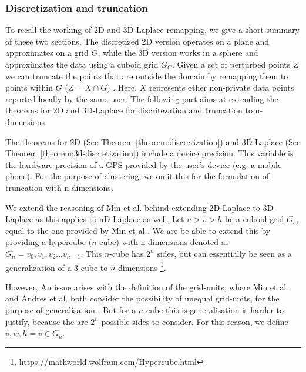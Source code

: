 \subsubsection{Discretization and truncation} \label{theory:nd-laplace-truncation}
To recall the working of 2D and 3D-Laplace remapping, we give a short summary of these two sections. The discretized 2D version operates on a plane and approximates on a grid $G$, while the 3D version works in a sphere and approximates the data using a cuboid grid  $G_C$.
Given a set of perturbed points $Z$ we can truncate the points that are outside the domain by remapping them to points within $G$ ($Z = X \cap G$) \citep{DBLP:journals/corr/abs-1212-1984}.
Here, $X$ represents other non-private data points reported locally by the same user.
The following part aims at extending the theorems for 2D and 3D-Laplace for discritezation and truncation to n-dimensions. \newline

The theorems for 2D (See Theorem \ref{theorem:discretization}) and 3D-Laplace (See Theorem \ref{theorem:3d-discretization}) include a device precision. 
This variable is the hardware precision of a GPS provided by the user's device (e.g. a mobile phone). 
For the purpose of clustering, we omit this for the formulation of truncation with n-dimensions.

We extend the reasoning of Min et al. behind extending 2D-Laplace to 3D-Laplace as this applies to nD-Laplace as well.
Let $u > v > h$ be a cuboid grid $G_c$, equal to the one provided by Min et al \citep{9646489}.
We are be-able to extend this by providing a hypercube ($n$-cube) with n-dimensions denoted as $G_n = v_0, v_1, v_2 ... v_{n-1}$. This $n$-cube has $2^n$ sides, but can essentially be seen as a generalization of a 3-cube to $n$-dimensions \footnote{https://mathworld.wolfram.com/Hypercube.html}.

However, An issue arises with the definition of the grid-units, where Min et al. and Andres et al. both consider the possibility of unequal grid-units, for the purpose of generalisation \citep{9646489, DBLP:journals/corr/abs-1212-1984}. 
But for a $n$-cube this is generalisation is harder to justify, because the are $2^n$ possible sides to consider.
For this reason, we define $v, w, h = v \in G_n$.


